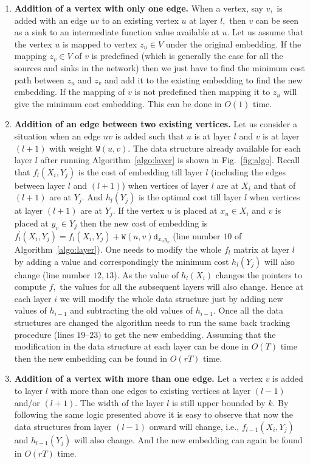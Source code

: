 \documentclass[journal]{IEEEtran}
\newcommand{\netnodes}{V}
\newcommand{\distance}{\mathtt{d}} \newcommand{\edgewt}{\mathtt{W}} \newcommand{\processingwt}{\mathtt{P}}
\begin{document}
\begin{enumerate}
\item \textbf{Addition of a vertex with only one edge.} When a vertex,
  say $v,$ is added with an edge $uv$ to an existing vertex $u$ at
  layer $l,$ then $v$ can be seen as a sink to an intermediate
  function value available at $u.$ Let us assume that the vertex $u$
  is mapped to vertex $z_u \in \netnodes$ under the original
  embedding. If the mapping $z_v \in \netnodes$ of $v$ is predefined
  (which is generally the case for all the sources and sinks in the
  network) then we just have to find the minimum cost path between
  $z_u$ and $z_v$ and add it to the existing embedding to find the new
  embedding. If the mapping of $v$ is not predefined then mapping it
  to $z_u$ will give the minimum cost embedding. This can be done in
  $O(1)$ time.

\item \textbf{Addition of an edge between two existing vertices.} Let
  us consider a situation when an edge $uv$ is added such that $u$ is
  at layer $l$ and $v$ is at layer $(l+1)$ with weight $\edgewt(u,v).$
  The data structure already available for each layer $l$ after
  running Algorithm~\ref{algo:layer} is shown in
  Fig.~\ref{fig:algo}. Recall that $f_l(X_i,Y_j)$ is the cost of
  embedding till layer $l$ (including the edges between layer $l$ and
  $(l+1)$) when vertices of layer $l$ are at $X_i$ and that of $(l+1)$
  are at $Y_j.$ And $h_l(Y_j)$ is the optimal cost till layer $l$ when
  vertices at layer $(l+1)$ are at $Y_j.$ If the vertex $u$ is placed
  at $x_u \in X_i$ and $v$ is placed at $y_v \in Y_j$ then the new
  cost of embedding is $f_l^{\prime}(X_i,Y_j) = f_l(X_i,Y_j) +
  \edgewt(u,v)\distance_{x_uy_v}$ (line number $10$ of
  Algorithm~\ref{algo:layer}). One needs to modify the whole $f_l$
  matrix at layer $l$ by adding a value and correspondingly the
  minimum cost $h_l(Y_j)$ will also change (line number $12,13$). As
  the value of $h_l(X_i)$ changes the pointers to compute $f,$ the
  values for all the subsequent layers will also change. Hence at each
  layer $i$ we will modify the whole data structure just by adding new
  values of $h_{i-1}$ and subtracting the old values of $h_{i-1}.$
  Once all the data structures are changed the algorithm needs to run
  the same back tracking procedure (lines $19$--$23)$ to get the new
  embedding. Assuming that the modification in the data structure at
  each layer can be done in $O(T)$ time then the new embedding can be
  found in $O(rT)$ time.

\item \textbf{Addition of a vertex with more than one edge.} Let a
  vertex $v$ is added to layer $l$ with more than one edges to
  existing vertices at layer $(l-1)$ and/or $(l+1).$ The width of the
  layer $l$ is still upper bounded by $k.$ By following the same logic
  presented above it is easy to observe that now the data structures
  from layer $(l-1)$ onward will change, i.e., $f_{l-1}(X_i,Y_j)$ and
  $h_{l-1}(Y_j)$ will also change. And the new embedding can again be
  found in $O(rT)$ time.
\end{enumerate}
\end{document}
